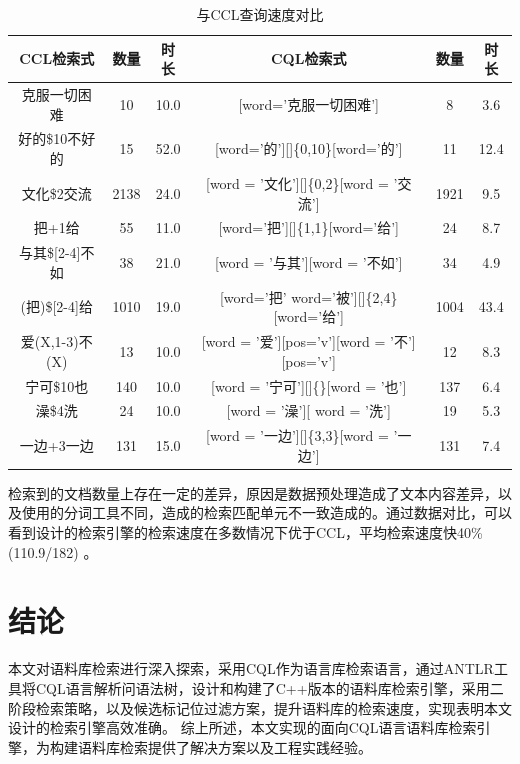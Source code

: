 \documentclass[11pt]{article}
\begin{document}
\begin{CJK*}{UTF8}{gbsn}
\begin{table}[h]
	\begin{center}
		\begin{tabular}{|c|c|c|c|c|c|}
			\hline \bf CCL检索式 & \bf 数量 & \bf 时长& \bf CQL检索式 & \bf 数量 & \bf 时长 \\ \hline
			克服一切困难 & 10 & 10.0 & [word='克服一切困难'] & 8 & 3.6 \\
			好的\$10不好的 &15 & 52.0 & [word='的'][]\{0,10\}[word='的'] & 11 & 12.4 \\
			文化\$2交流 & 2138 & 24.0 & [word = '文化'][]\{0,2\}[word = '交流'] & 1921 & 9.5 \\
			把+1给 & 55 & 11.0 & [word='把'][]\{1,1\}[word='给'] & 24 & 8.7 \\
			与其\$[2-4]不如 & 38 & 21.0 & [word = '与其'][word = '不如'] & 34 & 4.9 \\
			(把)\$[2-4]给 & 1010 & 19.0 & [word='把' \textbar word='被'][]\{2,4\}[word='给'] & 1004 & 43.4 \\
			爱(X,1-3)不(X) & 13 & 10.0 & [word = '爱'][pos='v'][word = '不'][pos='v'] & 12 & 8.3 \\
			宁可\$10也 & 140 & 10.0 & [word = '宁可'][]\{\}[word = '也'] & 137 & 6.4 \\
			澡\$4洗 & 24 & 10.0 & [word = '澡'][ word = '洗'] & 19 & 5.3 \\
			一边+3一边 & 131 & 15.0 & [word = '一边'][]\{3,3\}[word = '一边'] & 131 & 7.4 \\
			\hline
		\end{tabular}
	\end{center}
	\caption{\label{font-table} 与CCL查询速度对比}
\end{table}

检索到的文档数量上存在一定的差异，原因是数据预处理造成了文本内容差异，以及使用的分词工具不同，造成的检索匹配单元不一致造成的。通过数据对比，可以看到设计的检索引擎的检索速度在多数情况下优于CCL，平均检索速度快40\%(110.9/182) 。

\section{结论}

本文对语料库检索进行深入探索，采用CQL作为语言库检索语言，通过ANTLR工具将CQL语言解析问语法树，设计和构建了C++版本的语料库检索引擎，采用二阶段检索策略，以及候选标记位过滤方案，提升语料库的检索速度，实现表明本文设计的检索引擎高效准确。
\cite{li2023can}
综上所述，本文实现的面向CQL语言语料库检索引擎，为构建语料库检索提供了解决方案以及工程实践经验。



%


\end{CJK*}
\end{document}
